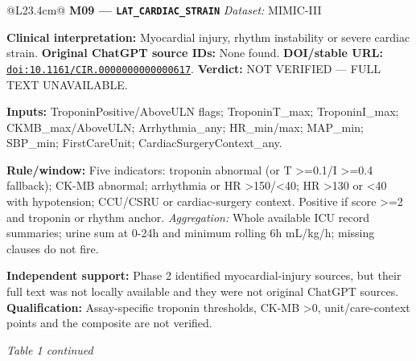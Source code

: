 \begin{tabular}{@{}L{23.4cm}@{}}
\addlinespace[3pt]
\midrule
\textbf{M09 --- \nolinkurl{LAT_CARDIAC_STRAIN}} \hfill \textit{Dataset:} MIMIC-III\par\textbf{Clinical interpretation:} Myocardial injury, rhythm instability or severe cardiac strain. \textbf{Original ChatGPT source IDs:} None found. \textbf{DOI/stable URL:} \href{https://doi.org/10.1161/CIR.0000000000000617}{\nolinkurl{doi:10.1161/CIR.0000000000000617}}. \textbf{Verdict:} NOT VERIFIED --- FULL TEXT UNAVAILABLE.\par\textbf{Inputs:} TroponinPositive/AboveULN flags; TroponinT\_max; TroponinI\_max; CKMB\_max/AboveULN; Arrhythmia\_any; HR\_min/max; MAP\_min; SBP\_min; FirstCareUnit; CardiacSurgeryContext\_any.\par\textbf{Rule/window:} Five indicators: troponin abnormal (or T >=0.1/I >=0.4 fallback); CK-MB abnormal; arrhythmia or HR >150/<40; HR >130 or <40 with hypotension; CCU/CSRU or cardiac-surgery context. Positive if score >=2 and troponin or rhythm anchor. \textit{Aggregation:} Whole available ICU record summaries; urine sum at 0-24h and minimum rolling 6h mL/kg/h; missing clauses do not fire.\par\textbf{Independent support:} Phase 2 identified myocardial-injury sources, but their full text was not locally available and they were not original ChatGPT sources. \textbf{Qualification:} Assay-specific troponin thresholds, CK-MB >0, unit/care-context points and the composite are not verified. \\
\addlinespace[3pt]
\midrule
\bottomrule
\end{tabular}
\clearpage
\textit{Table 1 continued}\par
